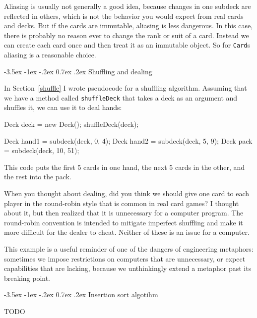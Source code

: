 \documentclass[12pt]{book}
\makeatletter
\renewcommand{\section}{\@startsection {section}{1}{\z@}%
    {-3.5ex \@plus -1ex \@minus -.2ex}%
    {0.7ex \@plus.2ex}%
    {\normalfont\Large\bfseries}}
\theoremstyle{exercise}
\newcommand{\java}[1]{\lstinline{#1}} %
\makeatother
\begin{document}

Aliasing is usually not generally a good idea, because changes in one subdeck are reflected in others, which is not the behavior you would expect from real cards and decks.
But if the cards are immutable, aliasing is less dangerous.
In this case, there is probably no reason ever to change the rank or suit of a card.
Instead we can create each card once and then treat it as an immutable object.
So for \java{Card}s aliasing is a reasonable choice.


\section{Shuffling and dealing}

In Section~\ref{shuffle} I wrote pseudocode for a shuffling algorithm.
Assuming that we have a method called \java{shuffleDeck} that takes a deck as an argument and shuffles it, we can use it to deal hands:

\begin{code}
    Deck deck = new Deck();
    shuffleDeck(deck);

    Deck hand1 = subdeck(deck, 0, 4);
    Deck hand2 = subdeck(deck, 5, 9);
    Deck pack = subdeck(deck, 10, 51);
\end{code}

This code puts the first 5 cards in one hand, the next 5 cards in the other, and the rest into the pack.

When you thought about dealing, did you think we should give one card to each player in the round-robin style that is common in real card games?
I thought about it, but then realized that it is unnecessary for a computer program.
The round-robin convention is intended to mitigate imperfect shuffling and make it more difficult for the dealer to cheat.
Neither of these is an issue for a computer.

This example is a useful reminder of one of the dangers of engineering metaphors: sometimes we impose restrictions on computers that are unnecessary, or expect capabilities that are lacking, because we unthinkingly extend a metaphor past its breaking point.


\section{Insertion sort algotihm}

TODO
\end{document}
